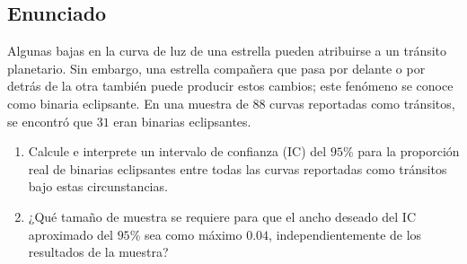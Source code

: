\documentclass[12pt]{article}
\begin{document}
\subsection*{Enunciado}
Algunas bajas en la curva de luz de una estrella pueden atribuirse a un tránsito planetario. Sin embargo, una estrella compañera que pasa por delante o por detrás de la otra también puede producir estos cambios; este fenómeno se conoce como binaria eclipsante. En una muestra de $88$ curvas reportadas como tránsitos, se encontró que $31$ eran binarias eclipsantes.
\begin{enumerate}[label=(\alph*)]
    \item Calcule e interprete un intervalo de confianza (IC) del $95\%$ para la proporción real de binarias eclipsantes entre todas las curvas reportadas como tránsitos bajo estas circunstancias.
    \item ¿Qué tamaño de muestra se requiere para que el ancho deseado del IC aproximado del $95\%$ sea como máximo $0.04$, independientemente de los resultados de la muestra?
\end{enumerate}
\end{document}
